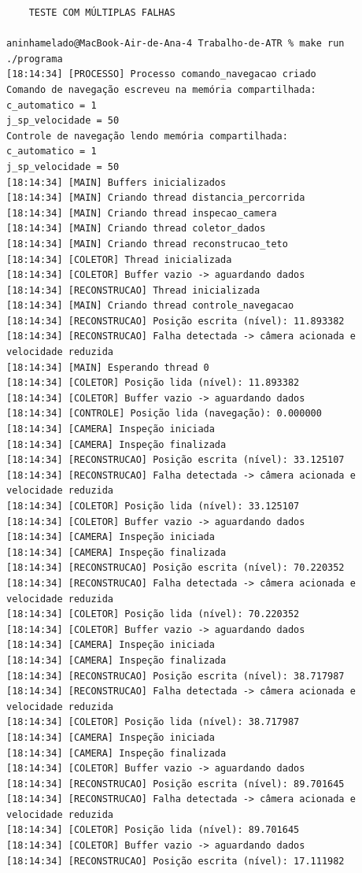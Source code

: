 \documentclass[12pt]{article}
\begin{document}
\begin{verbatim}
    TESTE COM MÚLTIPLAS FALHAS

aninhamelado@MacBook-Air-de-Ana-4 Trabalho-de-ATR % make run  
./programa
[18:14:34] [PROCESSO] Processo comando_navegacao criado
Comando de navegação escreveu na memória compartilhada:
c_automatico = 1
j_sp_velocidade = 50
Controle de navegação lendo memória compartilhada:
c_automatico = 1
j_sp_velocidade = 50
[18:14:34] [MAIN] Buffers inicializados
[18:14:34] [MAIN] Criando thread distancia_percorrida
[18:14:34] [MAIN] Criando thread inspecao_camera
[18:14:34] [MAIN] Criando thread coletor_dados
[18:14:34] [MAIN] Criando thread reconstrucao_teto
[18:14:34] [COLETOR] Thread inicializada
[18:14:34] [COLETOR] Buffer vazio -> aguardando dados
[18:14:34] [RECONSTRUCAO] Thread inicializada
[18:14:34] [MAIN] Criando thread controle_navegacao
[18:14:34] [RECONSTRUCAO] Posição escrita (nível): 11.893382
[18:14:34] [RECONSTRUCAO] Falha detectada -> câmera acionada e velocidade reduzida
[18:14:34] [MAIN] Esperando thread 0
[18:14:34] [COLETOR] Posição lida (nível): 11.893382
[18:14:34] [COLETOR] Buffer vazio -> aguardando dados
[18:14:34] [CONTROLE] Posição lida (navegação): 0.000000
[18:14:34] [CAMERA] Inspeção iniciada
[18:14:34] [CAMERA] Inspeção finalizada
[18:14:34] [RECONSTRUCAO] Posição escrita (nível): 33.125107
[18:14:34] [RECONSTRUCAO] Falha detectada -> câmera acionada e velocidade reduzida
[18:14:34] [COLETOR] Posição lida (nível): 33.125107
[18:14:34] [COLETOR] Buffer vazio -> aguardando dados
[18:14:34] [CAMERA] Inspeção iniciada
[18:14:34] [CAMERA] Inspeção finalizada
[18:14:34] [RECONSTRUCAO] Posição escrita (nível): 70.220352
[18:14:34] [RECONSTRUCAO] Falha detectada -> câmera acionada e velocidade reduzida
[18:14:34] [COLETOR] Posição lida (nível): 70.220352
[18:14:34] [COLETOR] Buffer vazio -> aguardando dados
[18:14:34] [CAMERA] Inspeção iniciada
[18:14:34] [CAMERA] Inspeção finalizada
[18:14:34] [RECONSTRUCAO] Posição escrita (nível): 38.717987
[18:14:34] [RECONSTRUCAO] Falha detectada -> câmera acionada e velocidade reduzida
[18:14:34] [COLETOR] Posição lida (nível): 38.717987
[18:14:34] [CAMERA] Inspeção iniciada
[18:14:34] [CAMERA] Inspeção finalizada
[18:14:34] [COLETOR] Buffer vazio -> aguardando dados
[18:14:34] [RECONSTRUCAO] Posição escrita (nível): 89.701645
[18:14:34] [RECONSTRUCAO] Falha detectada -> câmera acionada e velocidade reduzida
[18:14:34] [COLETOR] Posição lida (nível): 89.701645
[18:14:34] [COLETOR] Buffer vazio -> aguardando dados
[18:14:34] [RECONSTRUCAO] Posição escrita (nível): 17.111982

\end{verbatim}
\end{document}
